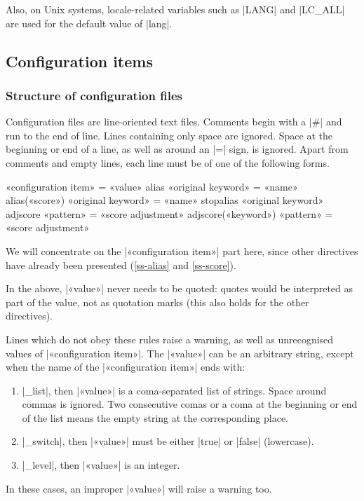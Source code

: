 \documentclass[a4paper, oneside]{scrartcl}
\makeatletter
\newenvironment{htcode}{%
  \SaveVerbatim[samepage, gobble=2]{verbmat}%
  }{%
  \endSaveVerbatim
  \par\medskip\noindent\hspace*{\parindent}%
  \BUseVerbatim{verbmat}%
  \par\medskip\@endpetrue}
\makeatother
\begin{document}
Also, on Unix systems, locale-related variables such as |LANG| and |LC_ALL|
are used for the default value of |lang|.

\subsection{Configuration items}\label{ss-conf}

\subsubsection{Structure of configuration files}\label{sss-sonf-struct}

Configuration files are line-oriented text files. Comments begin with a |#|
and run to the end of line. Lines containing only space are ignored. Space at
the beginning or end of a line, as well as around an |=| sign, is ignored.
Apart from comments and empty lines, each line must be of one of the following
forms.

\begin{htcode}
  «configuration item» = «value»
  alias «original keyword» = «name»
  alias(«score») «original keyword» = «name»
  stopalias «original keyword»
  adjscore «pattern» = «score adjustment»
  adjscore(«keyword») «pattern» = «score adjustment»
\end{htcode}

We will concentrate on the |«configuration item»| part here, since other
directives have already been presented (\ref{ss-alias} and \ref{ss-score}).

In the above, |«value»|  never needs to be quoted: quotes would be interpreted
as part of the value, not as quotation marks (this also holds for the other
directives).

Lines which do not obey these rules raise a warning, as well as unrecognised
values of |«configuration item»|. The |«value»| can be an arbitrary string,
except when the name of the |«configuration item»| ends with:
\begin{enumerate}
  \item |_list|, then |«value»| is a coma-separated list of strings. Space
    around commas is ignored. Two consecutive comas or a coma at the beginning
    or end of the list means the empty string at the corresponding place.
  \item |_switch|, then |«value»| must be either |true| or |false|
    (lowercase).
  \item |_level|, then |«value»| is an integer.
\end{enumerate}
In these cases, an improper |«value»| will raise a warning too.
\end{document}
